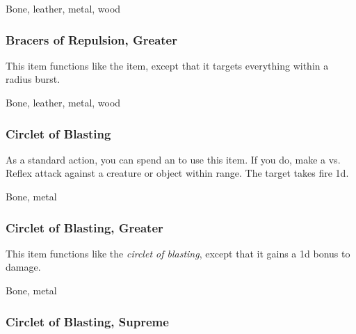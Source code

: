  


 Bone, leather, metal, wood


\lowercase{\hypertarget{item:Bracers of Repulsion, Greater}{}}\label{item:Bracers of Repulsion, Greater}
\hypertarget{item:Bracers of Repulsion, Greater}{\subsubsection{Bracers of Repulsion, Greater\hfill{}}}

This item functions like the  item, except that it targets everything within a \arealarge radius burst.



 


 Bone, leather, metal, wood


\lowercase{\hypertarget{item:Circlet of Blasting}{}}\label{item:Circlet of Blasting}
\hypertarget{item:Circlet of Blasting}{\subsubsection{Circlet of Blasting\hfill{}}}

As a standard action, you can spend an  to use this item.
If you do, make a  vs. Reflex attack against a creature or object within \rngmed range.
\hit The target takes fire  \plus1d.



 


 Bone, metal


\lowercase{\hypertarget{item:Circlet of Blasting, Greater}{}}\label{item:Circlet of Blasting, Greater}
\hypertarget{item:Circlet of Blasting, Greater}{\subsubsection{Circlet of Blasting, Greater\hfill{}}}

This item functions like the \textit{circlet of blasting}, except that it gains a \plus1d bonus to damage.



 


 Bone, metal


\lowercase{\hypertarget{item:Circlet of Blasting, Supreme}{}}\label{item:Circlet of Blasting, Supreme}
\hypertarget{item:Circlet of Blasting, Supreme}{\subsubsection{Circlet of Blasting, Supreme\hfill{}}}


